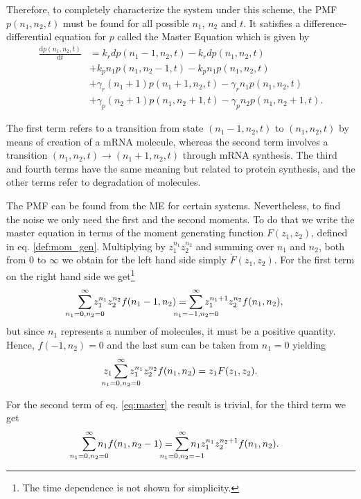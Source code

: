 Therefore, to completely characterize the system under this scheme, the PMF $p(n_1,n_2,t)$ must be found for all possible $n_1$, $n_2$ and $t$. It satisfies a difference-differential equation for $p$ called the Master Equation which is given by
\begin{equation}
  \label{eq:master}
  \begin{split}
    \frac{\mathrm{d}p(n_1,n_2,t)}{\mathrm{d}t} &= k_rdp(n_1-1,n_2,t) - k_rdp(n_1,n_2,t)\\
&+ k_pn_1p(n_1,n_2-1,t) - k_pn_1p(n_1,n_2,t)\\
&+ \gamma_r(n_1+1)p(n_1+1,n_2,t) - \gamma_rn_1p(n_1,n_2,t)\\
&+ \gamma_p(n_2+1)p(n_1,n_2+1,t) - \gamma_pn_2p(n_1,n_2+1,t).
  \end{split}
\end{equation}

The first term refers to a transition from state $(n_1-1,n_2,t)$ to $(n_1,n_2,t)$ by means of creation of a mRNA molecule, whereas the second term involves a transition $(n_1,n_2,t) \rightarrow (n_1+1,n_2,t)$ through mRNA synthesis. The third and fourth terms have the same meaning but related to protein synthesis, and the other terms refer to degradation of molecules.

The PMF can be found from the ME for certain systems. Nevertheless, to find the noise we only need the first and the second moments. To do that we write the master equation in terms of the moment generating function $F(z_1,z_2)$, defined in eq. \eqref{def:mom_gen}. Multiplying by $z_1^{n_1}z_2^{n_2}$ and summing over $n_1$ and $n_2$, both from $0$ to $\infty$ we obtain for the left hand side simply $\dot{F}(z_1,z_2)$. For the first term on the right hand side we get\footnote{The time dependence is not shown for simplicity.}
\begin{equation*}
  \sum_{\mathclap{n_1=0,n_2=0}}^\infty z_1^{n_1}z_2^{n_2}f(n_1-1,n_2) = \sum_{\mathclap{n_1=-1,n_2=0}}^\infty z_1^{n_1+1}z_2^{n_2}f(n_1,n_2),
\end{equation*}
but since $n_1$ represents a number of molecules, it must be a positive quantity. Hence, $f(-1,n_2)=0$ and the last sum can be taken from $n_1=0$ yielding
\begin{equation*}
  z_1 \sum_{\mathclap{n_1=0,n_2=0}}^\infty z_1^{n_1}z_2^{n_2}f(n_1,n_2) = z_1F(z_1,z_2).
\end{equation*}

For the second term of eq. \eqref{eq:master} the result is trivial, for the third term we get
\begin{equation*}
  \sum_{\mathclap{n_1=0,n_2=0}}^\infty n_1f(n_1,n_2-1) = \sum_{\mathclap{n_1=0,n_2=-1}}^\infty n_1z_1^{n_1}z_2^{n_2+1}f(n_1,n_2).
\end{equation*}

